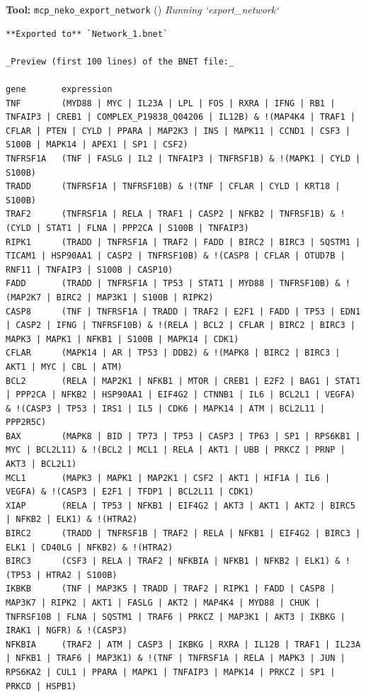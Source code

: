 \documentclass[11pt,a4paper]{article}
\begin{document}
\begin{toolokbox}
\textbf{Tool:} \texttt{mcp\_neko\_export\_network} (\checkmark)
\textit{Running `export\_network`}
\begin{lstlisting}
**Exported to** `Network_1.bnet`

_Preview (first 100 lines) of the BNET file:_

gene       expression
TNF        (MYD88 | MYC | IL23A | LPL | FOS | RXRA | IFNG | RB1 | TNFAIP3 | CREB1 | COMPLEX_P19838_Q04206 | IL12B) & !(MAP4K4 | TRAF1 | CFLAR | PTEN | CYLD | PPARA | MAP2K3 | INS | MAPK11 | CCND1 | CSF3 | S100B | MAPK14 | APEX1 | SP1 | CSF2)
TNFRSF1A   (TNF | FASLG | IL2 | TNFAIP3 | TNFRSF1B) & !(MAPK1 | CYLD | S100B)
TRADD      (TNFRSF1A | TNFRSF10B) & !(TNF | CFLAR | CYLD | KRT18 | S100B)
TRAF2      (TNFRSF1A | RELA | TRAF1 | CASP2 | NFKB2 | TNFRSF1B) & !(CYLD | STAT1 | FLNA | PPP2CA | S100B | TNFAIP3)
RIPK1      (TRADD | TNFRSF1A | TRAF2 | FADD | BIRC2 | BIRC3 | SQSTM1 | TICAM1 | HSP90AA1 | CASP2 | TNFRSF10B) & !(CASP8 | CFLAR | OTUD7B | RNF11 | TNFAIP3 | S100B | CASP10)
FADD       (TRADD | TNFRSF1A | TP53 | STAT1 | MYD88 | TNFRSF10B) & !(MAP2K7 | BIRC2 | MAP3K1 | S100B | RIPK2)
CASP8      (TNF | TNFRSF1A | TRADD | TRAF2 | E2F1 | FADD | TP53 | EDN1 | CASP2 | IFNG | TNFRSF10B) & !(RELA | BCL2 | CFLAR | BIRC2 | BIRC3 | MAPK3 | MAPK1 | NFKB1 | S100B | MAPK14 | CDK1)
CFLAR      (MAPK14 | AR | TP53 | DDB2) & !(MAPK8 | BIRC2 | BIRC3 | AKT1 | MYC | CBL | ATM)
BCL2       (RELA | MAP2K1 | NFKB1 | MTOR | CREB1 | E2F2 | BAG1 | STAT1 | PPP2CA | NFKB2 | HSP90AA1 | EIF4G2 | CTNNB1 | IL6 | BCL2L1 | VEGFA) & !(CASP3 | TP53 | IRS1 | IL5 | CDK6 | MAPK14 | ATM | BCL2L11 | PPP2R5C)
BAX        (MAPK8 | BID | TP73 | TP53 | CASP3 | TP63 | SP1 | RPS6KB1 | MYC | BCL2L11) & !(BCL2 | MCL1 | RELA | AKT1 | UBB | PRKCZ | PRNP | AKT3 | BCL2L1)
MCL1       (MAPK3 | MAPK1 | MAP2K1 | CSF2 | AKT1 | HIF1A | IL6 | VEGFA) & !(CASP3 | E2F1 | TFDP1 | BCL2L11 | CDK1)
XIAP       (RELA | TP53 | NFKB1 | EIF4G2 | AKT3 | AKT1 | AKT2 | BIRC5 | NFKB2 | ELK1) & !(HTRA2)
BIRC2      (TRADD | TNFRSF1B | TRAF2 | RELA | NFKB1 | EIF4G2 | BIRC3 | ELK1 | CD40LG | NFKB2) & !(HTRA2)
BIRC3      (CSF3 | RELA | TRAF2 | NFKBIA | NFKB1 | NFKB2 | ELK1) & !(TP53 | HTRA2 | S100B)
IKBKB      (TNF | MAP3K5 | TRADD | TRAF2 | RIPK1 | FADD | CASP8 | MAP3K7 | RIPK2 | AKT1 | FASLG | AKT2 | MAP4K4 | MYD88 | CHUK | TNFRSF10B | FLNA | SQSTM1 | TRAF6 | PRKCZ | MAP3K1 | AKT3 | IKBKG | IRAK1 | NGFR) & !(CASP3)
NFKBIA     (TRAF2 | ATM | CASP3 | IKBKG | RXRA | IL12B | TRAF1 | IL23A | NFKB1 | TRAF6 | MAP3K1) & !(TNF | TNFRSF1A | RELA | MAPK3 | JUN | RPS6KA2 | CUL1 | PPARA | MAPK1 | TNFAIP3 | MAPK14 | PRKCZ | SP1 | PRKCD | HSPB1)

\end{lstlisting}
\end{toolokbox}
\end{document}
